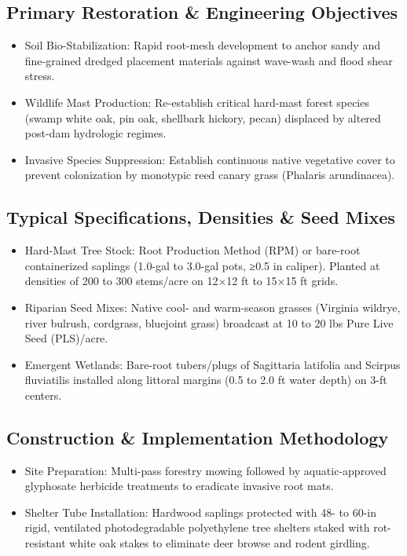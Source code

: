 \documentclass[
  letterpaper,
  DIV=11,
  numbers=noendperiod]{scrreprt}
\begin{document}
\subsection{Primary Restoration \& Engineering
Objectives}\label{primary-restoration-engineering-objectives-3}

\begin{itemize}
\item
  Soil Bio-Stabilization: Rapid root-mesh development to anchor sandy
  and fine-grained dredged placement materials against wave-wash and
  flood shear stress.
\item
  Wildlife Mast Production: Re-establish critical hard-mast forest
  species (swamp white oak, pin oak, shellbark hickory, pecan) displaced
  by altered post-dam hydrologic regimes.
\item
  Invasive Species Suppression: Establish continuous native vegetative
  cover to prevent colonization by monotypic reed canary grass (Phalaris
  arundinacea).
\end{itemize}

\subsection{Typical Specifications, Densities \& Seed
Mixes}\label{typical-specifications-densities-seed-mixes}

\begin{itemize}
\item
  Hard-Mast Tree Stock: Root Production Method (RPM) or bare-root
  containerized saplings (1.0-gal to 3.0-gal pots, ≥0.5 in caliper).
  Planted at densities of 200 to 300 stems/acre on 12×12 ft to 15×15 ft
  grids.
\item
  Riparian Seed Mixes: Native cool- and warm-season grasses (Virginia
  wildrye, river bulrush, cordgrass, bluejoint grass) broadcast at 10 to
  20 lbs Pure Live Seed (PLS)/acre.
\item
  Emergent Wetlands: Bare-root tubers/plugs of Sagittaria latifolia and
  Scirpus fluviatilis installed along littoral margins (0.5 to 2.0 ft
  water depth) on 3-ft centers.
\end{itemize}

\subsection{Construction \& Implementation
Methodology}\label{construction-implementation-methodology-4}

\begin{itemize}
\item
  Site Preparation: Multi-pass forestry mowing followed by
  aquatic-approved glyphosate herbicide treatments to eradicate invasive
  root mats.
\item
  Shelter Tube Installation: Hardwood saplings protected with 48- to
  60-in rigid, ventilated photodegradable polyethylene tree shelters
  staked with rot-resistant white oak stakes to eliminate deer browse
  and rodent girdling.
\end{itemize}
\end{document}

